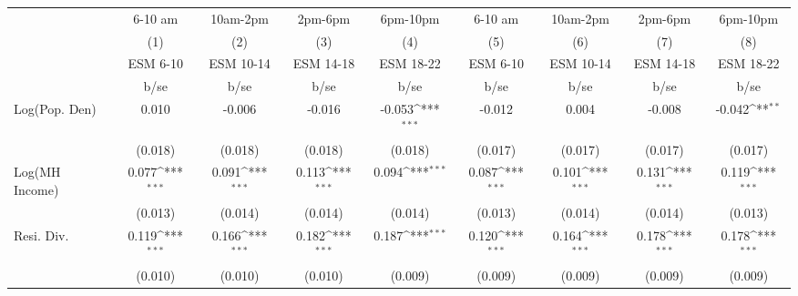 {
\def\sym#1{\ifmmode^{#1}\else\(^{#1}\)\fi}
\begin{tabular}{l*{8}{c}}
\toprule
                    &\multicolumn{1}{c}{6-10 am}&\multicolumn{1}{c}{10am-2pm}&\multicolumn{1}{c}{2pm-6pm}&\multicolumn{1}{c}{6pm-10pm}&\multicolumn{1}{c}{6-10 am}&\multicolumn{1}{c}{10am-2pm}&\multicolumn{1}{c}{2pm-6pm}&\multicolumn{1}{c}{6pm-10pm}\\\cmidrule(lr){2-2}\cmidrule(lr){3-3}\cmidrule(lr){4-4}\cmidrule(lr){5-5}\cmidrule(lr){6-6}\cmidrule(lr){7-7}\cmidrule(lr){8-8}\cmidrule(lr){9-9}
                    &\multicolumn{1}{c}{(1)}&\multicolumn{1}{c}{(2)}&\multicolumn{1}{c}{(3)}&\multicolumn{1}{c}{(4)}&\multicolumn{1}{c}{(5)}&\multicolumn{1}{c}{(6)}&\multicolumn{1}{c}{(7)}&\multicolumn{1}{c}{(8)}\\
                    &\multicolumn{1}{c}{ESM 6-10}&\multicolumn{1}{c}{ESM 10-14}&\multicolumn{1}{c}{ESM 14-18}&\multicolumn{1}{c}{ESM 18-22}&\multicolumn{1}{c}{ESM 6-10}&\multicolumn{1}{c}{ESM 10-14}&\multicolumn{1}{c}{ESM 14-18}&\multicolumn{1}{c}{ESM 18-22}\\
                    &        b/se         &        b/se         &        b/se         &        b/se         &        b/se         &        b/se         &        b/se         &        b/se         \\
\midrule
Log(Pop. Den)       &       0.010         &      -0.006         &      -0.016         &      -0.053\sym{***}&      -0.012         &       0.004         &      -0.008         &      -0.042\sym{**} \\
                    &     (0.018)         &     (0.018)         &     (0.018)         &     (0.018)         &     (0.017)         &     (0.017)         &     (0.017)         &     (0.017)         \\
Log(MH Income)      &       0.077\sym{***}&       0.091\sym{***}&       0.113\sym{***}&       0.094\sym{***}&       0.087\sym{***}&       0.101\sym{***}&       0.131\sym{***}&       0.119\sym{***}\\
                    &     (0.013)         &     (0.014)         &     (0.014)         &     (0.014)         &     (0.013)         &     (0.014)         &     (0.014)         &     (0.013)         \\
Resi. Div.          &       0.119\sym{***}&       0.166\sym{***}&       0.182\sym{***}&       0.187\sym{***}&       0.120\sym{***}&       0.164\sym{***}&       0.178\sym{***}&       0.178\sym{***}\\
                    &     (0.010)         &     (0.010)         &     (0.010)         &     (0.009)         &     (0.009)         &     (0.009)         &     (0.009)         &     (0.009)         \\

\end{tabular}}
